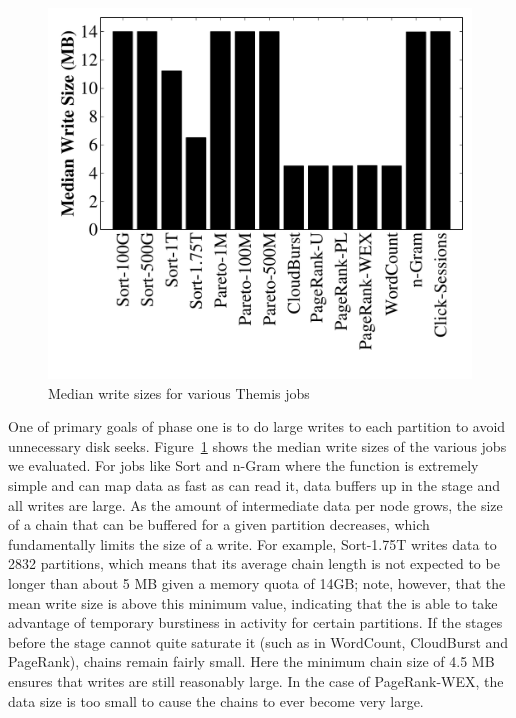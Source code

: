 \begin{figure}
  \includegraphics[width=\columnwidth]{themis/graphs/write_sizes_median_bars.pdf}
  \caption{\label{fig:write_sizes} Median write sizes for various Themis jobs}
\end{figure}

One of primary goals of phase one is to do large writes to each partition to
avoid unnecessary disk seeks.  Figure~\ref{fig:write_sizes} shows the median
write sizes of the various jobs we evaluated.  For jobs like Sort and n-Gram
where the \map function is extremely simple and \mappers can map data as fast
as \readers can read it, data buffers up in the \Chainer stage and all writes
are large. As the amount of intermediate data per node grows, the size of a
chain that can be buffered for a given partition decreases, which fundamentally
limits the size of a write. For example, Sort-1.75T writes data to 2832
partitions, which means that its average chain length is not expected to be
longer than about 5 MB given a \receiver memory quota of 14GB; note, however,
that the mean write size is above this minimum value, indicating that the
\writer is able to take advantage of temporary burstiness in activity for
certain partitions.  If the stages before the \Writer stage cannot quite
saturate it (such as in WordCount, CloudBurst and PageRank), chains remain
fairly small. Here the minimum chain size of 4.5 MB ensures that writes are
still reasonably large. In the case of PageRank-WEX, the data size is
too small to cause the chains to ever become very large.

